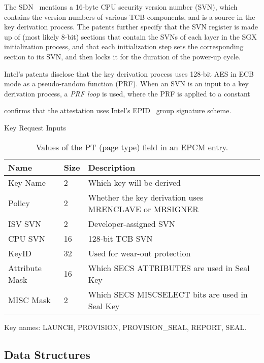 The SDN~\cite{intel2015sdm} mentions a 16-byte CPU security version number
(SVN), which contains the version numbers of various TCB components, and is a
source in the key derivation process. The patents further specify that the SVN
register is made up of (most likely 8-bit) sections that contain the SVNs of
each layer in the SGX initialization process, and that each initialization step
sets the corresponding section to its SVN, and then locks it for the duration
of the power-up cycle.

Intel's patents disclose that the key derivation process uses 128-bit AES in
ECB mode as a pseudo-random function (PRF). When an SVN is an input to a key
derivation process, a \textit{PRF loop} is used, where the PRF is applied to
a constant



\cite{anati2013sgx} confirms that the attestation uses Intel's
EPID~\cite{brickell2009epid} group signature scheme.


Key Request Inputs

\begin{table}[hbt]
  \centering
  \begin{tabularx}{\columnwidth}{| l | l | X |}
  \hline
  \textbf{Name} & \textbf{Size} & \textbf{Description}\\
  \hline
  Key Name & 2 & Which key will be derived \\
  \hline
  Policy & 2 & Whether the key derivation uses MRENCLAVE or MRSIGNER \\
  \hline
  ISV SVN & 2 & Developer-assigned SVN \\
  \hline
  CPU SVN & 16 & 128-bit TCB SVN \\
  \hline
  KeyID & 32 & Used for wear-out protection \\
  \hline
  Attribute Mask & 16 & Which SECS ATTRIBUTES are used in Seal Key \\
  \hline
  MISC Mask & 2 & Which SECS MISCSELECT bits are used in Seal Key \\
  \hline
  \end{tabularx}
  \caption{Values of the PT (page type) field in an EPCM entry.}
  \label{fig:key_request_inputs}
\end{table}

Key names: LAUNCH, PROVISION, PROVISION\_SEAL, REPORT, SEAL.


\subsection{Data Structures}

